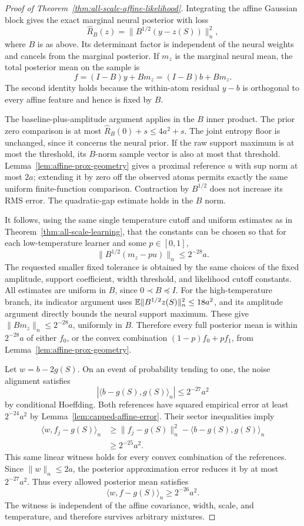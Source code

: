 \begin{proof}[Proof of Theorem~\ref{thm:all-scale-affine-likelihood}]
Integrating the affine Gaussian block gives the exact marginal neural posterior with loss
\[
 \widehat R_B(z)=\|B^{1/2}(y-z(S))\|_n^2,
\]
where $B$ is as above. Its determinant factor is independent of the neural weights and cancels from the marginal posterior. If $m_z$ is the marginal neural mean, the total posterior mean on the sample is
\[
 f=(I-B)y+Bm_z=(I-B)b+Bm_z.
\]
The second identity holds because the within-atom residual $y-b$ is orthogonal to every affine feature and hence is fixed by $B$.

The baseline-plus-amplitude argument applies in the $B$ inner product. The prior zero comparison is at most $\widehat R_B(0)+s\le4a^2+s$. The joint entropy floor is unchanged, since it concerns the neural prior. If the raw support maximum is at most the threshold, its $B$-norm sample vector is also at most that threshold. Lemma~\ref{lem:affine-prox-geometry} gives a proximal reference $u$ with sup norm at most $2a$; extending it by zero off the observed atoms permits exactly the same uniform finite-function comparison. Contraction by $B^{1/2}$ does not increase its RMS error. The quadratic-gap estimate holds in the $B$ norm.

It follows, using the same single temperature cutoff and uniform estimates as in Theorem~\ref{thm:all-scale-learning}, that the constants can be chosen so that for each low-temperature learner and some $p\in[0,1]$,
\[
 \|B^{1/2}(m_z-pu)\|_n\le2^{-28}a.
\]
The requested smaller fixed tolerance is obtained by the same choices of the fixed amplitude, support coefficient, width threshold, and likelihood cutoff constants. All estimates are uniform in $B$, since $0\prec B\preceq I$. For the high-temperature branch, its indicator argument uses $\mathbb E\|B^{1/2}z(S)\|_n^2\le18a^2$, and its amplitude argument directly bounds the neural support maximum. These give $\|Bm_z\|_n\le2^{-28}a$, uniformly in $B$. Therefore every full posterior mean is within $2^{-28}a$ of either $f_0$, or the convex combination $(1-p)f_0+pf_1$, from Lemma~\ref{lem:affine-prox-geometry}.

Let $w=b-2g(S)$. On an event of probability tending to one, the noise alignment satisfies
\[
 |\langle b-g(S),g(S)\rangle_n|\le2^{-27}a^2
\]
by conditional Hoeffding. Both references have squared empirical error at least $2^{-24}a^2$ by Lemma~\ref{lem:capped-affine-error}. Their sector inequalities imply
\begin{align*}
 \langle w,f_j-g(S)\rangle_n
 &\ge\|f_j-g(S)\|_n^2
                -\langle b-g(S),g(S)\rangle_n\\
 &\ge2^{-25}a^2.
\end{align*}
This same linear witness holds for every convex combination of the references. Since $\|w\|_n\le2a$, the posterior approximation error reduces it by at most $2^{-27}a^2$. Thus every allowed posterior mean satisfies
\[
 \langle w,f-g(S)\rangle_n\ge2^{-26}a^2.
\]
The witness is independent of the affine covariance, width, scale, and temperature, and therefore survives arbitrary mixtures.


\end{proof}
